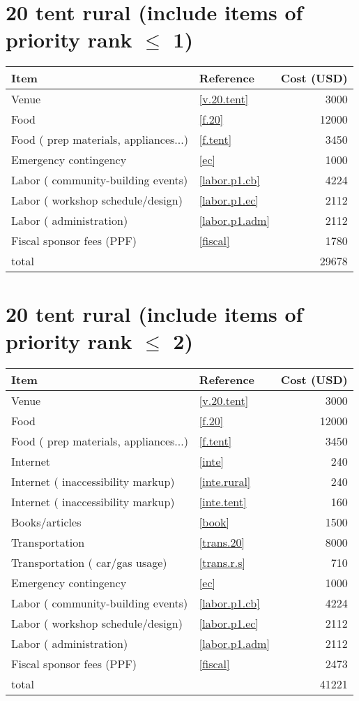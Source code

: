 \section*{20 tent rural (include items of priority rank $\leq$ 1)}
\begin{center}
\begin{tabular}{llr}
Item & Reference & Cost (USD) \\ \hline
Venue & \ref{v.20.tent} & 3000 \\
Food & \ref{f.20} & 12000 \\
Food ( prep materials, appliances...) & \ref{f.tent} & 3450 \\
Emergency contingency & \ref{ec} & 1000 \\
Labor ( community-building events) & \ref{labor.p1.cb} & 4224 \\
Labor ( workshop schedule/design) & \ref{labor.p1.ec} & 2112 \\
Labor ( administration) & \ref{labor.p1.adm} & 2112 \\
Fiscal sponsor fees (PPF) & \ref{fiscal} & 1780 \\ \hline
total &  & 29678
\end{tabular}
\end{center}
\newpage
\section*{20 tent rural (include items of priority rank $\leq$ 2)}
\begin{center}
\begin{tabular}{llr}
Item & Reference & Cost (USD) \\ \hline
Venue & \ref{v.20.tent} & 3000 \\
Food & \ref{f.20} & 12000 \\
Food ( prep materials, appliances...) & \ref{f.tent} & 3450 \\
Internet & \ref{inte} & 240 \\
Internet ( inaccessibility markup) & \ref{inte.rural} & 240 \\
Internet ( inaccessibility markup) & \ref{inte.tent} & 160 \\
Books/articles & \ref{book} & 1500 \\
Transportation & \ref{trans.20} & 8000 \\
Transportation ( car/gas usage) & \ref{trans.r.s} & 710 \\
Emergency contingency & \ref{ec} & 1000 \\
Labor ( community-building events) & \ref{labor.p1.cb} & 4224 \\
Labor ( workshop schedule/design) & \ref{labor.p1.ec} & 2112 \\
Labor ( administration) & \ref{labor.p1.adm} & 2112 \\
Fiscal sponsor fees (PPF) & \ref{fiscal} & 2473 \\ \hline
total &  & 41221
\end{tabular}
\end{center}
\newpage

